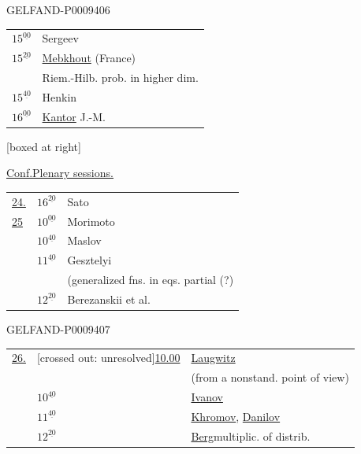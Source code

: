 \begin{GelfandAdjacentEvidence}{GELFAND-P000940}{6}


\begin{tabular}{@{}ll@{}}
$15^{\underline{00}}$ & Sergeev\\
$15^{\underline{20}}$ & \underline{Mebkhout} (France)\\
& Riem.-Hilb. prob. in higher dim.\\
$15^{\underline{40}}$ & Henkin\\
$16^{\underline{00}}$ & \underline{Kantor} J.-M.
\end{tabular}

[boxed at right]

\underline{Conf.}\qquad\underline{\underline{Plenary sessions.}}

\begin{tabular}{@{}lll@{}}
\underline{24.} & $16^{\underline{20}}$ & Sato\\
\underline{25} & $10^{\underline{00}}$ & Morimoto\\
 & $10^{\underline{40}}$ & Maslov\\
 & $11^{\underline{40}}$ & Gesztelyi\\
 & & (generalized fns. in eqs. partial (?)\\
 & $12^{\underline{20}}$ & Berezanskii et al.
\end{tabular}
\end{GelfandAdjacentEvidence}
\begin{GelfandAdjacentEvidence}{GELFAND-P000940}{7}


\begin{tabular}{@{}lll@{}}
\underline{26.} & [crossed out: unresolved]\quad\underline{10.00} & \underline{Laugwitz}\\
 & & (from a nonstand. point of view)\\
 & $10^{\underline{40}}$ & \underline{Ivanov}\\
 & $11^{\underline{40}}$ & \underline{Khromov}, \underline{Danilov}\\
 & $12^{\underline{20}}$ & \underline{Berg}\quad multiplic. of distrib.
\end{tabular}
\end{GelfandAdjacentEvidence}
